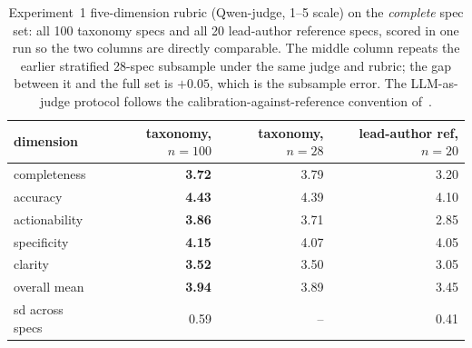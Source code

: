 \documentclass[11pt]{article}
\begin{document}
\begin{table}[t]\centering\footnotesize

\begin{tabular}{lrrr}\toprule
dimension & taxonomy, $n=100$ & taxonomy, $n=28$ & lead-author ref, $n=20$ \\\midrule
completeness & \textbf{3.72} & 3.79 & 3.20 \\
accuracy & \textbf{4.43} & 4.39 & 4.10 \\
actionability & \textbf{3.86} & 3.71 & 2.85 \\
specificity & \textbf{4.15} & 4.07 & 4.05 \\
clarity & \textbf{3.52} & 3.50 & 3.05 \\\midrule
overall mean & \textbf{3.94} & 3.89 & 3.45 \\
sd across specs & 0.59 & -- & 0.41 \\
\bottomrule\end{tabular}
\caption{Experiment~1 five-dimension rubric (Qwen-judge, 1--5 scale) on the \emph{complete}
spec set: all 100 taxonomy specs and all 20 lead-author reference specs, scored in one run so
the two columns are directly comparable. The middle column repeats the earlier stratified
28-spec subsample under the same judge and rubric; the gap between it and the full set is
$+0.05$, which is the subsample error. The LLM-as-judge protocol follows the
calibration-against-reference convention of~\cite{gilardi2023chatgpt, pangakis2023automated,
zheng2023judging}.}\label{tab:rubric}\end{table}
\end{document}
